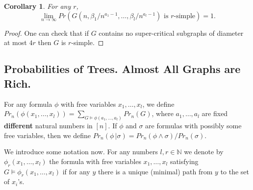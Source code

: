 \documentclass[11pt,notitlepage]{report}
\newtheorem{corollary}{Corollary}[chapter]
\theoremstyle{definition}
\newcommand{\N}{\mathbb{N}}
\newcommand{\Ln}{\lim\limits_{n\to \infty}}
\begin{document}
\begin{corollary} \label{thm:simple} 
	For any $r$,
	\[\Ln Pr(G(n,\beta_1/n^{a_1-1}, \dots,\beta_l/n^{a_l-1} ) \text{ is }r \text{-simple})=1 .\]
\end{corollary}
\begin{proof}
	One can check that if $G$ contains no super-critical subgraphs of
	diameter at most $4r$ then $G$ is $r$-simple.
\end{proof}


\subsection{Probabilities of Trees. Almost All Graphs are Rich.}



For any formula $\phi$ with free variables 
$x_1, \dots, x_l$, we define $Pr_n(\phi(x_1,\dots,x_l))=
\sum\limits_{G\models \phi(a_1,\dots,a_l)} Pr_n(G) $, 
where $a_1, \dots, a_l$ are fixed \textbf{different}
natural numbers in $[n]$. If $\phi$ and $\sigma$ are 
formulas with possibly some free variables, then we define
$Pr_n(\phi \, | \sigma)=Pr_n(\phi\wedge \sigma)/Pr_n(\sigma)$. \par

We introduce some notation now. For any numbers $l,r\in \N$ 
we denote by $\phi_r(x_1,\dots, x_l)$ the formula
with free variables $x_1,\dots, x_l$
satisfying $G\models \phi_r(x_1,\dots, x_l)$ 
if for any $y$ there is a unique
(minimal) path from $y$ to the set of $x_i$'s. 
\end{document}
